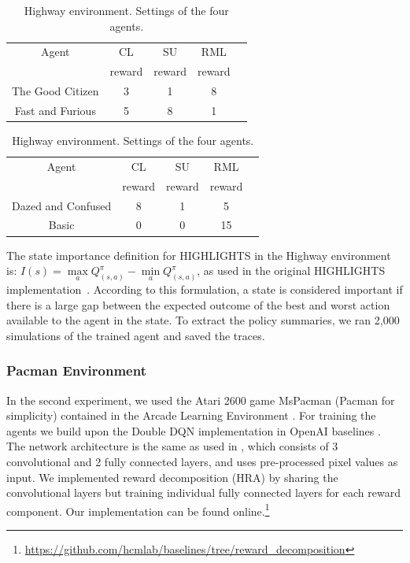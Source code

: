 \documentclass[runningheads]{llncs}
\begin{document}
\begin{table}
\caption{Highway environment. Settings of the four agents.}
\label{tab:reward setting}
\parbox{.45\linewidth}{
    \centering
    \begin{tabular}{c|c c c c }
        \hline
         Agent & CL  & SU & RML  \\
           & reward & reward& reward \\
        \hline
        The Good Citizen & 3 & 1 & 8  \\
         Fast and Furious & 5 & 8 & 1  \\
        \hline
    \end{tabular}
    }
     \hfill
\parbox{.5\linewidth}{
    \centering
    \begin{tabular}{c|c c c c }
        \hline
          Agent & CL  & SU & RML  \\
           & reward & reward& reward \\
        \hline
Dazed and Confused & 8 & 1 & 5 \\        
         Basic & 0 & 0 & 15 \\
        \hline
    \end{tabular}
    }
\end{table}

The state importance definition for HIGHLIGHTS in the Highway environment is: $I(s) = \max\limits_{a} Q^{\pi}_{(s,a)}- \min\limits_{a}Q^{\pi}_{(s,a)}$, as used in the original HIGHLIGHTS implementation~\cite{amir2018highlights}. 
According to this formulation, a state is considered important if there is a large gap between the expected outcome of the best and worst action available to the agent in the state.
To extract the policy summaries, we ran 2,000 simulations of the trained agent and saved the traces.

\subsubsection{Pacman Environment}

In the second experiment, we used the Atari 2600 game MsPacman (Pacman for simplicity) contained in the Arcade Learning Environment \cite{bellemare2013ALE}.
For training the agents we build upon the Double DQN implementation in OpenAI baselines \cite{baselines}.
The network architecture is the same as used in \cite{mnih2015human}, which consists of 3 convolutional and 2 fully connected layers, and uses pre-processed pixel values as input.
We implemented reward decomposition (HRA) by sharing the convolutional layers but training individual fully connected layers for each reward component.
Our implementation can be found online.\footnote{\url{https://github.com/hcmlab/baselines/tree/reward\_decomposition}}
\end{document}
